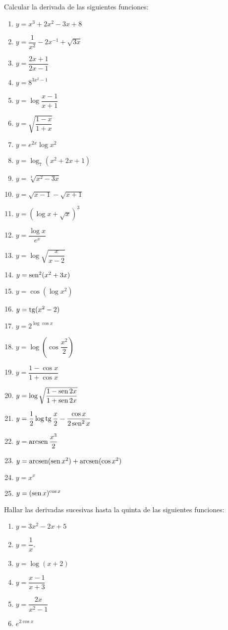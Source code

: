 {Calcular la derivada de las siguientes funciones:
\begin{multicols}{2}
\begin{enumerate}
\item $y=x^3+2x^2-3x+8$
\item $y=\dfrac{1}{x^2}-2x^{-1}+\sqrt{3x}$
\item $y=\dfrac{2x+1}{2x-1}$
\item $y=8^{3x^2-1}$
\item $y=\log \dfrac{x-1}{x+1}$
\item $y=\sqrt{\dfrac{1-x}{1+x}}$
\item $y=e^{2x}\log x^2$
\item $y=\log_7(x^2+2x+1)$
\item $y=\sqrt[4]{x^2-3x}$
\item $y=\sqrt{x-1}-\sqrt{x+1}$
\item $y=(\log x+\sqrt{x})^3$
\item $y=\dfrac{\log x}{e^x}$
\item $y=\log \sqrt{\dfrac{x}{x-2}}$
\item $y=\operatorname{sen}^2(x^2+3x)$
\item $y=\cos(\log x^2)$
\item $y=\operatorname{tg}(x^2-2)$
\item $y=2^{\log \cos x}$
\item $y=\log\left(\cos\dfrac{x^2}{2}\right)$
\item $y=\dfrac{1-\cos x}{1+\cos x}$
\item $y=\log\sqrt{\dfrac{1-\operatorname{sen} 2x}{1+\operatorname{sen} 2x}}$
\item $y=\dfrac{1}{2}\log \operatorname{tg} \dfrac{x}{2}-\dfrac{\cos x}{2\operatorname{sen}^2 x}$
\item $y=\operatorname{arcsen} \dfrac{x^3}{2}$
\item $y=\operatorname{arcsen}(\operatorname{sen} x^2)+\operatorname{arcsen}(\cos x^2)$
\item $y=x^x$
\item $y=(\operatorname{sen} x)^{\cos x}$
\end{enumerate}
\end{multicols}
}


{Hallar las derivadas sucesivas hasta la quinta de las siguientes funciones:
\begin{multicols}{2}
\begin{enumerate}
\item $y=3x^2-2x+5$
\item $y=\dfrac{1}{x}.$
\item $y=\log(x+2)$
\item $y=\dfrac{x-1}{x+3}$
\item $y=\dfrac{2x}{x^2-1}$
\item $e^{2\cos x}$
\end{enumerate}
\end{multicols}
}


